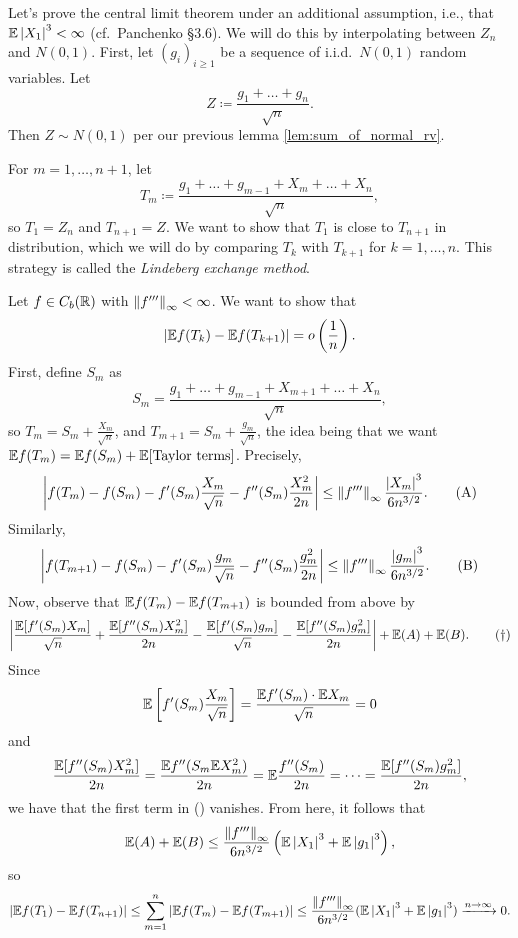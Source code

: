 Let's prove the central limit theorem under an additional assumption, i.e., that $\mathbb E \left\lvert X_1 \right\rvert^3 < \infty$ (cf.\ Panchenko \S3.6). We will do this by interpolating between $Z_n$ and $N(0, 1)$. First, let $(g_i)_{i \geq 1}$ be a sequence of i.i.d.\ $N(0, 1)$ random variables. Let
\[ Z \coloneq \frac{g_1 + \dots + g_n}{\sqrt n}. \]
Then $Z \sim N(0, 1)$ per our previous lemma \ref{lem:sum_of_normal_rv}.

\newpage
For $m = 1, \dots, n+1$, let
\[ T_m \coloneq \frac{g_1 + \dots + g_{m-1} + X_m + \dots + X_n}{\sqrt{n}}, \]
so $T_1 = Z_n$ and $T_{n+1} = Z$. We want to show that $T_1$ is close to $T_{n+1}$ in distribution, which we will do by comparing $T_k$ with $T_{k+1}$ for $k = 1, \dots, n$. This strategy is called the \textit{Lindeberg exchange method}.

Let $f \in C_b(\mathbb R)$ with $\left\lVert f''' \right\rVert_\infty < \infty$. We want to show that
\[ \left\lvert \mathbb E f(T_k) - \mathbb E f(T_{k+1}) \right\rvert = o \left(\frac{1}{n}\right). \]
First, define $S_m$ as
\[ S_m = \frac{g_1 + \dots + g_{m-1} + X_{m+1} + \dots + X_n}{\sqrt{n}}, \]
so $T_m = S_m + \frac{X_m}{\sqrt n}$, and $T_{m+1} = S_m + \frac{g_m}{\sqrt{n}}$, the idea being that we want $\mathbb E f(T_m) = \mathbb E f(S_m) + \mathbb E[\text{Taylor terms}]$. Precisely,
\[ \left\lvert f(T_m) - f(S_m) - f'(S_m) \frac{X_m}{\sqrt{n}} - f''(S_m) \frac{X_m^2}{2n} \right\rvert \leq \left\lVert f''' \right\rVert_\infty \frac{\left\lvert X_m \right\rvert^3}{6n^{3/2}}. \tag{A} \]
Similarly,
\[ \left\lvert f(T_{m+1}) - f(S_m) - f'(S_m) \frac{g_m}{\sqrt{n}} - f''(S_m) \frac{g_m^2}{2n} \right\rvert \leq \left\lVert f''' \right\rVert_\infty \frac{\left\lvert g_m \right\rvert^3}{6n^{3/2}}. \tag{B} \]
Now, observe that $\mathbb E f(T_m) - \mathbb E f(T_{m+1})$ is bounded from above by 
\[ \left\lvert \frac{\mathbb E [f'(S_m) X_m]}{\sqrt n} + \frac{\mathbb E [f''(S_m) X_m^2]}{2n} - \frac{\mathbb E [f'(S_m) g_m]}{\sqrt n} - \frac{\mathbb E [f''(S_m) g_m^2]}{2n} \right\rvert + \mathbb E(A) + \mathbb E(B). \tag{\textdagger} \]
Since
\[ \mathbb E \left[f'(S_m) \frac{X_m}{\sqrt{n}}\right] = \frac{\mathbb E f'(S_m) \cdot \mathbb E X_m}{\sqrt n} = 0 \]
and
\[ \frac{\mathbb E [f''(S_m) X_m^2]}{2n} = \frac{\mathbb E f''(S_m \mathbb E X_m^2)}{2n} = \mathbb E \frac{f''(S_m)}{2n} = \dots = \frac{\mathbb E [f''(S_m) g_m^2]}{2n}, \]
we have that the first term in (\textdagger) vanishes. From here, it follows that
\[ \mathbb E(A) + \mathbb E(B) \leq \frac{\left\lVert f''' \right\rVert_\infty}{6n^{3/2}} \left(\mathbb E \left\lvert X_1 \right\rvert^3 + \mathbb E \left\lvert g_1 \right\rvert^3\right), \]
so
\[ \left\lvert \mathbb E f(T_1) - \mathbb E f(T_{n+1}) \right\rvert \leq \sum_{m=1}^n \left\lvert \mathbb E f(T_m) - \mathbb E f(T_{m+1}) \right\rvert \leq \frac{\left\lVert f''' \right\rVert_\infty}{6n^{3/2}} (\mathbb E \left\lvert X_1 \right\rvert^3 + \mathbb E \left\lvert g_1 \right\rvert^3) \xrightarrow{n \to \infty} 0. \]